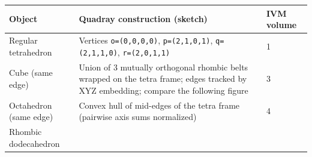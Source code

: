 \documentclass[
  10pt,
]{article}
\newcommand{\passthrough}[1]{#1}
\begin{document}
\begin{longtable}[]{@{}lll@{}}
\toprule
\begin{minipage}[b]{0.30\columnwidth}\raggedright
Object\strut
\end{minipage} & \begin{minipage}[b]{0.30\columnwidth}\raggedright
Quadray construction (sketch)\strut
\end{minipage} & \begin{minipage}[b]{0.30\columnwidth}\raggedright
IVM volume\strut
\end{minipage}\tabularnewline
\midrule
\endhead
\begin{minipage}[t]{0.30\columnwidth}\raggedright
Regular tetrahedron\strut
\end{minipage} & \begin{minipage}[t]{0.30\columnwidth}\raggedright
Vertices \passthrough{\lstinline!o=(0,0,0,0)!},
\passthrough{\lstinline!p=(2,1,0,1)!},
\passthrough{\lstinline!q=(2,1,1,0)!},
\passthrough{\lstinline!r=(2,0,1,1)!}\strut
\end{minipage} & \begin{minipage}[t]{0.30\columnwidth}\raggedright
1\strut
\end{minipage}\tabularnewline
\begin{minipage}[t]{0.30\columnwidth}\raggedright
Cube (same edge)\strut
\end{minipage} & \begin{minipage}[t]{0.30\columnwidth}\raggedright
Union of 3 mutually orthogonal rhombic belts wrapped on the tetra frame;
edges tracked by XYZ embedding; compare the following figure\strut
\end{minipage} & \begin{minipage}[t]{0.30\columnwidth}\raggedright
3\strut
\end{minipage}\tabularnewline
\begin{minipage}[t]{0.30\columnwidth}\raggedright
Octahedron (same edge)\strut
\end{minipage} & \begin{minipage}[t]{0.30\columnwidth}\raggedright
Convex hull of mid-edges of the tetra frame (pairwise axis sums
normalized)\strut
\end{minipage} & \begin{minipage}[t]{0.30\columnwidth}\raggedright
4\strut
\end{minipage}\tabularnewline
\begin{minipage}[t]{0.30\columnwidth}\raggedright
Rhombic dodecahedron\strut
\end{minipage} & \begin{minipage}[t]{0.30\columnwidth}\raggedright

\end{minipage}
\end{longtable}
\end{document}
